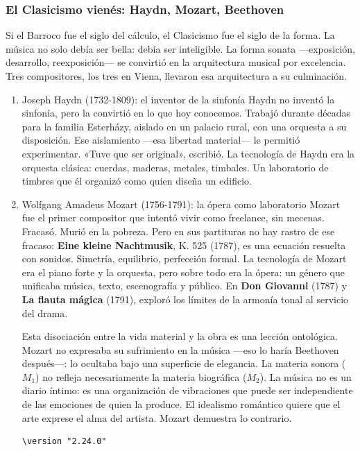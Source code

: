 \documentclass[14pt, a4paper]{article}
\begin{document}
\subsubsection{El Clasicismo vienés: Haydn, Mozart, Beethoven}
\label{clasicismo-vienes}
Si el Barroco fue el siglo del cálculo, el Clasicismo fue el siglo de
la forma. La música no solo debía ser bella: debía ser inteligible.
La forma sonata —exposición, desarrollo, reexposición— se convirtió en
la arquitectura musical por excelencia. Tres compositores, los tres
en Viena, llevaron esa arquitectura a su culminación.
\begin{enumerate}
\item Joseph Haydn (1732-1809): el inventor de la sinfonía
\label{haydn}
Haydn no inventó la sinfonía, pero la convirtió en lo que hoy
conocemos. Trabajó durante décadas para la familia Esterházy, aislado
en un palacio rural, con una orquesta a su disposición. Ese
aislamiento —esa libertad material— le permitió experimentar. «Tuve
que ser original», escribió. La tecnología de Haydn era la orquesta
clásica: cuerdas, maderas, metales, timbales. Un laboratorio de
timbres que él organizó como quien diseña un edificio.
\item Wolfgang Amadeus Mozart (1756-1791): la ópera como laboratorio
\label{mozart}
Mozart fue el primer compositor que intentó vivir como freelance, sin
mecenas. Fracasó. Murió en la pobreza. Pero en sus partituras no hay
rastro de ese fracaso: \textbf{Eine kleine Nachtmusik}, K. 525 (1787), es una
ecuación resuelta con sonidos. Simetría, equilibrio, perfección
formal. La tecnología de Mozart era el piano forte y la orquesta,
pero sobre todo era la ópera: un género que unificaba música, texto,
escenografía y público. En \textbf{Don Giovanni} (1787) y \textbf{La flauta mágica}
(1791), exploró los límites de la armonía tonal al servicio del drama.

Esta disociación entre la vida material y la obra es una lección
ontológica. Mozart no expresaba su sufrimiento en la música —eso lo
haría Beethoven después—: lo ocultaba bajo una superficie de
elegancia. La materia sonora (\(M_1\)) no refleja necesariamente la
materia biográfica (\(M_2\)). La música no es un diario íntimo: es una
organización de vibraciones que puede ser independiente de las
emociones de quien la produce. El idealismo romántico quiere que el
arte exprese el alma del artista. Mozart demuestra lo contrario.

\begin{verbatim}
\version "2.24.0"


\end{verbatim}
\end{enumerate}
\end{document}
